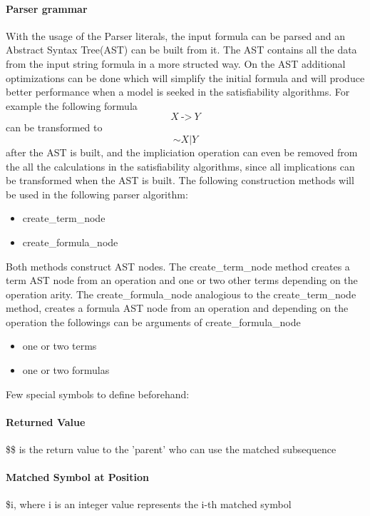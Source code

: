 \documentclass{article}
\begin{document}
		\paragraph{Parser grammar}
			With the usage of the Parser literals, the input formula can be parsed and an Abstract Syntax Tree(AST) can be built from it.
			The AST contains all the data from the input string formula in a more structed way. 
			On the AST additional optimizations can be done which will simplify the initial formula and will produce better performance when 
			a model is seeked in the satisfiability algorithms. For example the following formula 
			\begin{equation}
				X\  \textit{->}\  Y 
			\end{equation}
			can be transformed to 
			\begin{equation}
				\sim X | Y
			\end{equation}
			after the AST is built, and the impliciation operation can even be removed from the all the calculations in the satisfiability algorithms, 
			since all implications can be transformed when the AST is built.
			\newline
			The following construction methods will be used in the following parser algorithm:
			\begin{itemize}
				\item create\_term\_node 
				\item create\_formula\_node 
			\end{itemize}
			Both methods construct AST nodes. The create\_term\_node method creates a term AST node from an operation and one or two other terms depending on the operation arity.
			The create\_formula\_node analogious to the create\_term\_node method, creates a formula AST node from an operation and depending on the operation the followings can be arguments of create\_formula\_node 
			\begin{itemize}
				\item one or two terms
				\item one or two formulas
			\end{itemize}
			Few special symbols to define beforehand:
			\paragraph{Returned Value} \$\$ is the return value to the 'parent' who can use the matched subsequence
			\paragraph{Matched Symbol at Position} \$i, where i is an integer value  represents the i-th matched symbol
\end{document}
